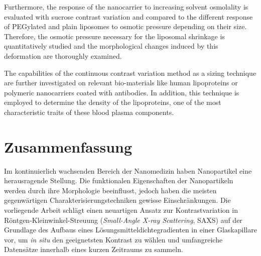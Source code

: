 Furthermore, the response of the nanocarrier to increasing solvent osmolality is evaluated with sucrose contrast variation and compared to the different response of PEGylated and plain liposomes to osmotic pressure depending on their size. Therefore, the osmotic pressure necessary for the liposomal shrinkage is quantitatively studied and the morphological changes induced by this deformation are thoroughly examined.


The capabilities of the continuous contrast variation method as a sizing technique  are further investigated on relevant bio-materials like human lipoproteins or polymeric nanocarriers coated with antibodies. In addition, this technique is employed to determine the density of the lipoproteins, one of the most characteristic traits of these blood plasma components.






\cleardoublepage



\chapter*{Zusammenfassung}

\thispagestyle{empty}



Im kontinuierlich wachsenden Bereich der Nanomedizin haben Nanopartikel eine herausragende Stellung. Die funktionalen Eigenschaften der Nanopartikeln werden durch ihre Morphologie beeinflusst, jedoch haben die meisten gegenwärtigen Charakterisierungstechniken gewisse Einschränkungen. Die vorliegende Arbeit schlägt einen neuartigen Ansatz zur Kontrastvariation in Röntgen-Kleinwinkel-Streuung (\emph{Small-Angle X-ray Scattering}, SAXS) auf der Grundlage des Aufbaus eines Lösungsmitteldichtegradienten in einer Glaskapillare vor, um \emph{in situ} den geeignetsten Kontrast zu wählen und umfangreiche Datensätze innerhalb eines kurzen Zeitraums zu sammeln.

